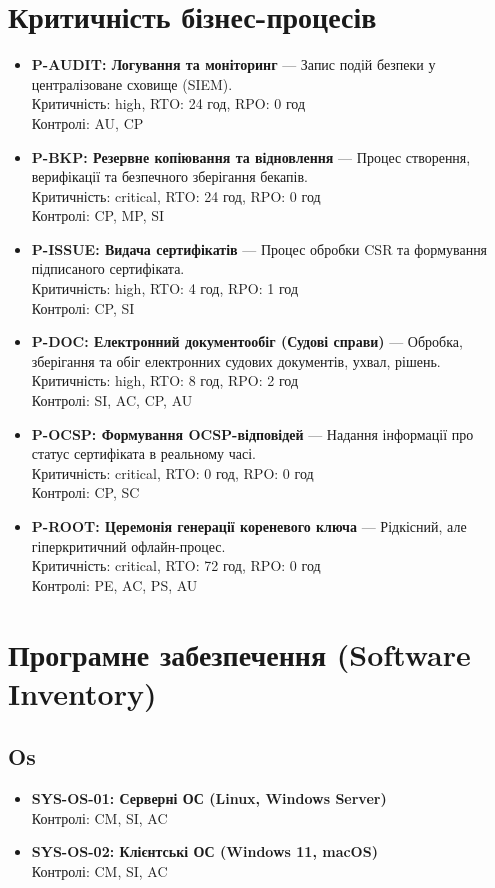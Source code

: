 \documentclass{article}
\begin{document}
\section{Критичність бізнес-процесів}
\begin{itemize}
\item \textbf{P-AUDIT: Логування та моніторинг} — Запис подій безпеки у централізоване сховище (SIEM).
\\ Критичність: high, RTO: 24 год, RPO: 0 год
\\ Контролі: AU, CP
\item \textbf{P-BKP: Резервне копіювання та відновлення} — Процес створення, верифікації та безпечного зберігання бекапів.
\\ Критичність: critical, RTO: 24 год, RPO: 0 год
\\ Контролі: CP, MP, SI
\item \textbf{P-ISSUE: Видача сертифікатів} — Процес обробки CSR та формування підписаного сертифіката.
\\ Критичність: high, RTO: 4 год, RPO: 1 год
\\ Контролі: CP, SI
\item \textbf{P-DOC: Електронний документообіг (Судові справи)} — Обробка, зберігання та обіг електронних судових документів, ухвал, рішень.
\\ Критичність: high, RTO: 8 год, RPO: 2 год
\\ Контролі: SI, AC, CP, AU
\item \textbf{P-OCSP: Формування OCSP-відповідей} — Надання інформації про статус сертифіката в реальному часі.
\\ Критичність: critical, RTO: 0 год, RPO: 0 год
\\ Контролі: CP, SC
\item \textbf{P-ROOT: Церемонія генерації кореневого ключа} — Рідкісний, але гіперкритичний офлайн-процес.
\\ Критичність: critical, RTO: 72 год, RPO: 0 год
\\ Контролі: PE, AC, PS, AU
\end{itemize}


\newpage
\section{Програмне забезпечення (Software Inventory)}
\subsection{Os}
\begin{itemize}
\item \textbf{SYS-OS-01: Серверні ОС (Linux, Windows Server)}
\\ Контролі: CM, SI, AC
\item \textbf{SYS-OS-02: Клієнтські ОС (Windows 11, macOS)}
\\ Контролі: CM, SI, AC
\end{itemize}
\end{document}
